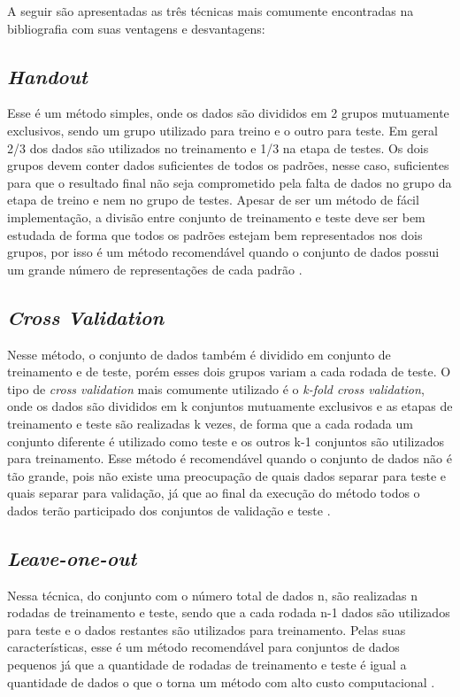 A seguir são apresentadas as três técnicas mais comumente encontradas na bibliografia com suas ventagens e desvantagens:

\subsection{\textit{Handout}}
Esse é um método simples, onde os dados são divididos em 2 grupos mutuamente exclusivos, sendo um grupo utilizado para treino e o outro para teste. Em geral 2/3 dos dados são utilizados no treinamento e 1/3 na etapa de testes. Os dois grupos devem conter dados suficientes de todos os padrões, nesse caso, suficientes para que o resultado final não seja comprometido pela falta de dados no grupo da etapa de treino e nem no grupo de testes. Apesar de ser um método de fácil implementação, a divisão entre conjunto de treinamento e teste deve ser bem estudada de forma que todos os padrões estejam bem representados nos dois grupos, por isso é um método recomendável quando o conjunto de dados possui um grande número de representações de cada padrão \cite{Kohavi95Cross} \cite{Baldisserotto05Validacao}.

\subsection {\textit{Cross Validation}}
Nesse método, o conjunto de dados também é dividido em conjunto de treinamento e de teste, porém esses dois grupos variam a cada rodada de teste. O tipo de \textit{cross validation} mais comumente utilizado é o \textit{k-fold cross validation}, onde os dados são divididos em k conjuntos mutuamente exclusivos e as etapas de treinamento e teste são realizadas k vezes, de forma que a cada rodada um conjunto diferente é utilizado como teste e os outros k-1 conjuntos são utilizados para treinamento. Esse método é recomendável quando o conjunto de dados não é tão grande, pois não existe uma  preocupação de quais dados separar para teste e quais separar para validação, já que ao final da execução do método todos o dados terão participado dos conjuntos de validação e teste \cite{Kohavi95Cross} \cite{Baldisserotto05Validacao}.

\subsection{\textit{Leave-one-out}}
Nessa técnica, do conjunto com o número total de dados n, são realizadas n rodadas de treinamento e teste, sendo que a cada rodada n-1 dados são utilizados para teste e o dados restantes são utilizados para treinamento. Pelas suas características, esse é um método recomendável para conjuntos de dados pequenos já que a quantidade de rodadas de treinamento e teste é igual a quantidade de dados o que o torna um método com alto custo computacional \cite{Kohavi95Cross} \cite{Baldisserotto05Validacao}.
